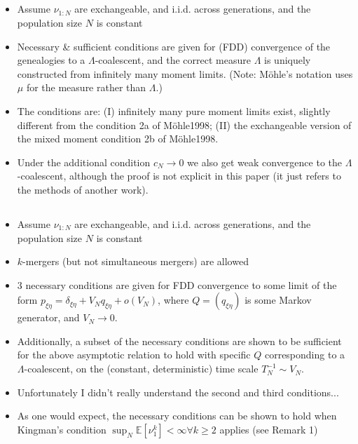 \documentclass{article}
\newcommand{\E}{\mathbb{E}}
\begin{document}
\subsection*{\cite{mohlesagitov1998}}
\begin{itemize}
\item Assume $\nu_{1:N}$ are exchangeable, and i.i.d. across generations, and the population size $N$ is constant
\item Necessary \& sufficient conditions are given for (FDD) convergence of the genealogies to a $\Lambda$-coalescent, and the correct measure $\Lambda$ is uniquely constructed from infinitely many moment limits. (Note: M\"ohle's notation uses $\mu$ for the measure rather than $\Lambda$.)
\item The conditions are: (I) infinitely many pure moment limits exist, slightly different from the condition 2a of M\"ohle1998; (II) the exchangeable version of the mixed moment condition 2b of M\"ohle1998.
\item Under the additional condition $c_N\to0$ we also get weak convergence to the $\Lambda$-coalescent, although the proof is not explicit in this paper (it just refers to the methods of another work).
\end{itemize}


\subsection*{\cite{sagitov1999}}
\begin{itemize}
\item Assume $\nu_{1:N}$ are exchangeable, and i.i.d. across generations, and the population size $N$ is constant
\item $k$-mergers (but not simultaneous mergers) are allowed
\item 3 necessary conditions are given for FDD convergence to some limit of the form $p_{\xi\eta} = \delta_{\xi\eta} + V_N q_{\xi\eta} + o(V_N)$, where $Q=(q_{\xi\eta})$ is some Markov generator, and $V_N \to 0$.
\item Additionally, a subset of the necessary conditions are shown to be sufficient for the above asymptotic relation to hold with specific $Q$ corresponding to a $\Lambda$-coalescent, on the (constant, deterministic) time scale $T_N^{-1} \sim V_N$.
\item Unfortunately I didn't really understand the second and third conditions...
\item As one would expect, the necessary conditions can be shown to hold when Kingman's condition $\sup_N \E[\nu_1^k]<\infty \forall k\geq 2$ applies (see Remark 1)
\end{itemize}
\end{document}
